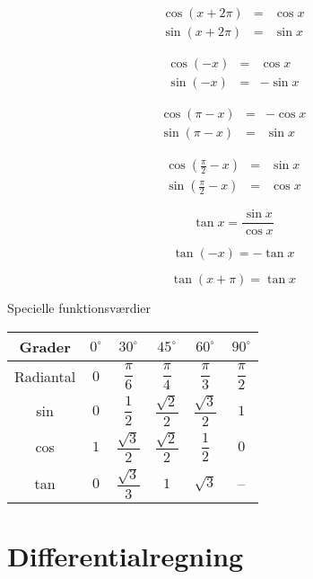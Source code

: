 \documentclass[11pt,a5paper,fleqn,leqno]{book}
\begin{document}
\begin{eqnarray}
\cos(x + 2\pi) & = & \cos x \\
\sin(x + 2\pi) & = & \sin x \nonumber
\end{eqnarray}

\begin{eqnarray}
\cos(-x) & = & \cos x \\
\sin(-x) & = & - \sin x \nonumber
\end{eqnarray}

\begin{eqnarray}
\cos(\pi - x) & = & - \cos x \\
\sin(\pi - x) & = & \sin x \nonumber
\end{eqnarray}

\begin{eqnarray}
\cos\left(\frac{\pi}{2}-x\right) & = & \sin x \\
\sin\left(\frac{\pi}{2}-x\right) & = & \cos x \nonumber
\end{eqnarray}

\begin{equation}
\tan x = \frac{\sin x}{\cos x}
\end{equation}

\begin{equation}
\tan(-x) = -\tan x
\end{equation}

\begin{equation}
\tan(x+\pi) = \tan x
\end{equation}

Specielle funktionsværdier

\begin{tabular}{c|c c c c c}
\hline
Grader       & $0^{\circ}$ & $30^{\circ}$ & $45^{\circ}$ & $60^{\circ}$ & $90^{\circ}$ \\
\hline
Radiantal    & $0$ & $\dfrac{\pi}{6}$ & $\dfrac{\pi}{4}$ & $\dfrac{\pi}{3}$ & $\dfrac{\pi}{2}$ \\
\hline
sin          & $0$ & $\dfrac{1}{2}$ & $\dfrac{\sqrt{2}}{2}$ & $\dfrac{\sqrt{3}}{2}$ & $1$ \\
\hline
cos          & $1$ & $\dfrac{\sqrt{3}}{2}$ & $\dfrac{\sqrt{2}}{2}$ & $\dfrac{1}{2}$ & $0$ \\
\hline
tan          & $0$ & $\dfrac{\sqrt{3}}{3}$ & $1$ & $\sqrt{3}$ & -- \\
\hline
\end{tabular}

\section{Differentialregning}
\end{document}
